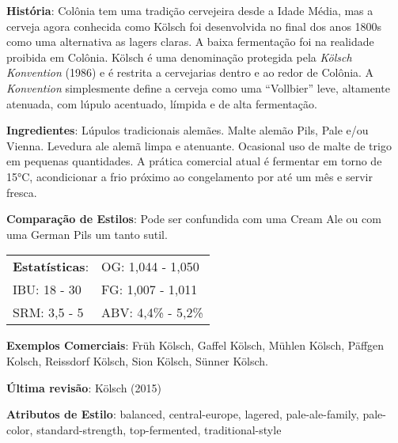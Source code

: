 \textbf{História}: Colônia tem uma tradição cervejeira desde a Idade Média, mas a cerveja agora conhecida como Kölsch foi desenvolvida no final dos anos 1800s como uma alternativa as lagers claras. A baixa fermentação foi na realidade proibida em Colônia. Kölsch é uma denominação protegida pela \textit{Kölsch Konvention} (1986) e é restrita a cervejarias dentro e ao redor de Colônia. A \textit{Konvention} simplesmente define a cerveja como uma “Vollbier” leve, altamente atenuada, com lúpulo acentuado, límpida e de alta fermentação.

\textbf{Ingredientes}: Lúpulos tradicionais alemães. Malte alemão Pils, Pale e/ou Vienna. Levedura ale alemã limpa e atenuante. Ocasional uso de malte de trigo em pequenas quantidades. A prática comercial atual é fermentar em torno de 15°C, acondicionar a frio próximo ao congelamento por até um mês e servir fresca.

\textbf{Comparação de Estilos}: Pode ser confundida com uma Cream Ale ou com uma German Pils um tanto sutil.

\begin{tabular}{@{}p{35mm}p{35mm}@{}}
  \textbf{Estatísticas}: & OG: 1,044 - 1,050 \\
  IBU: 18 - 30  & FG: 1,007 - 1,011  \\
  SRM: 3,5 - 5  & ABV: 4,4\% - 5,2\%
\end{tabular}

\textbf{Exemplos Comerciais}: Früh Kölsch, Gaffel Kölsch, Mühlen Kölsch, Päffgen Kolsch, Reissdorf Kölsch, Sion Kölsch, Sünner Kölsch.

\textbf{Última revisão}: Kölsch (2015)

\textbf{Atributos de Estilo}: balanced, central-europe, lagered, pale-ale-family, pale-color, standard-strength, top-fermented, traditional-style

